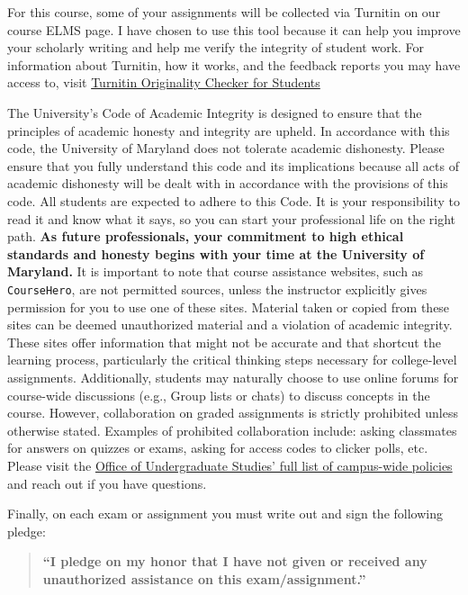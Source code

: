 \documentclass[11pt]{article}
\begin{document}
For this course, some of your assignments will be collected via Turnitin
on our course ELMS page. I have chosen to use this tool because it can
help you improve your scholarly writing and help me verify the integrity
of student work. For information about Turnitin, how it works, and the
feedback reports you may have access to, visit
\href{https://umd.service-now.com/itsc?id=kb_article\&sys_id=c0116d8f0f7ef2007f232ca8b1050e63}{Turnitin
Originality Checker for Students}

The University's Code of Academic Integrity is designed to ensure that
the principles of academic honesty and integrity are upheld. In
accordance with this code, the University of Maryland does not tolerate
academic dishonesty. Please ensure that you fully understand this code
and its implications because all acts of academic dishonesty will be
dealt with in accordance with the provisions of this code. All students
are expected to adhere to this Code. It is your responsibility to read
it and know what it says, so you can start your professional life on the
right path. \textbf{As future professionals, your commitment to high
ethical standards and honesty begins with your time at the University of
Maryland.} It is important to note that course assistance websites, such
as \texttt{CourseHero}, are not permitted sources, unless the instructor
explicitly gives permission for you to use one of these sites. Material
taken or copied from these sites can be deemed unauthorized material and
a violation of academic integrity. These sites offer information that
might not be accurate and that shortcut the learning process,
particularly the critical thinking steps necessary for college-level
assignments. Additionally, students may naturally choose to use online
forums for course-wide discussions (e.g., Group lists or chats) to
discuss concepts in the course. However, collaboration on graded
assignments is strictly prohibited unless otherwise stated. Examples of
prohibited collaboration include: asking classmates for answers on
quizzes or exams, asking for access codes to clicker polls, etc. Please
visit the
\href{http://www.ugst.umd.edu/courserelatedpolicies.html}{Office of
Undergraduate Studies' full list of campus-wide policies} and reach out
if you have questions.

Finally, on each exam or assignment you must write out and sign the
following pledge:

\begin{quote}
\textbf{``I pledge on my honor that I have not given or received any
unauthorized assistance on this exam/assignment.''}
\end{quote}
\end{document}
